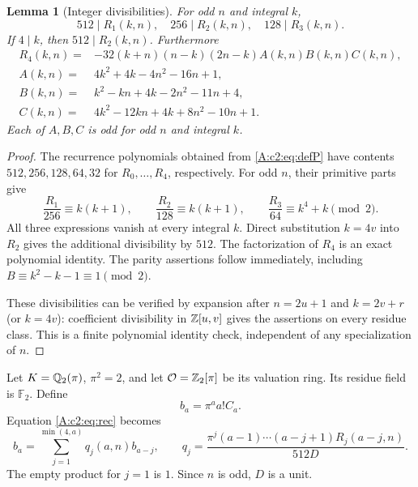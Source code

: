 \documentclass[11pt]{article}
\newtheorem{lemma}[theorem]{Lemma}
\numberwithin{equation}{section}
\begin{document}
\begin{lemma}[Integer divisibilities]\label{A:c2:lem:div}
For odd $n$ and integral $k$,
\[
 512\mid R_1(k,n),\quad256\mid R_2(k,n),\quad128\mid R_3(k,n).
\]
If $4\mid k$, then $512\mid R_2(k,n)$. Furthermore
\begin{align*}
 R_4(k,n)={}&-32(k+n)(n-k)(2n-k)A(k,n)B(k,n)C(k,n),\\
 A(k,n)={}&4k^2+4k-4n^2-16n+1,\\
 B(k,n)={}&k^2-kn+4k-2n^2-11n+4,\\
 C(k,n)={}&4k^2-12kn+4k+8n^2-10n+1.
\end{align*}
Each of $A,B,C$ is odd for odd $n$ and integral $k$.
\end{lemma}
\begin{proof}
The recurrence polynomials obtained from \eqref{A:c2:eq:defP} have contents $512,256,128,64,32$ for $R_0,\ldots,R_4$, respectively. For odd $n$, their primitive parts give
\[
 \frac{R_1}{256}\equiv k(k+1),\qquad
 \frac{R_2}{128}\equiv k(k+1),\qquad
 \frac{R_3}{64}\equiv k^4+k\pmod2.
\]
All three expressions vanish at every integral $k$. Direct substitution $k=4v$ into $R_2$ gives the additional divisibility by $512$. The factorization of $R_4$ is an exact polynomial identity. The parity assertions follow immediately, including $B\equiv k^2-k-1\equiv1\pmod2$.

These divisibilities can be verified by expansion after $n=2u+1$ and $k=2v+r$ (or $k=4v$): coefficient divisibility in $\mathbb Z[u,v]$ gives the assertions on every residue class. This is a finite polynomial identity check, independent of any specialization of $n$.
\end{proof}

Let $K=\mathbb Q_2(\pi)$, $\pi^2=2$, and let $\mathcal O=\mathbb Z_2[\pi]$ be its valuation ring. Its residue field is $\mathbb F_2$. Define
\[
 b_a=\pi^a a!C_a.
\]
Equation \eqref{A:c2:eq:rec} becomes
\begin{equation}\label{A:c2:eq:scaled}
 b_a=\sum_{j=1}^{\min(4,a)}q_j(a,n)b_{a-j},\qquad
 q_j=\frac{\pi^j(a-1)\cdots(a-j+1)R_j(a-j,n)}{512D}.
\end{equation}
The empty product for $j=1$ is $1$. Since $n$ is odd, $D$ is a unit.
\end{document}
